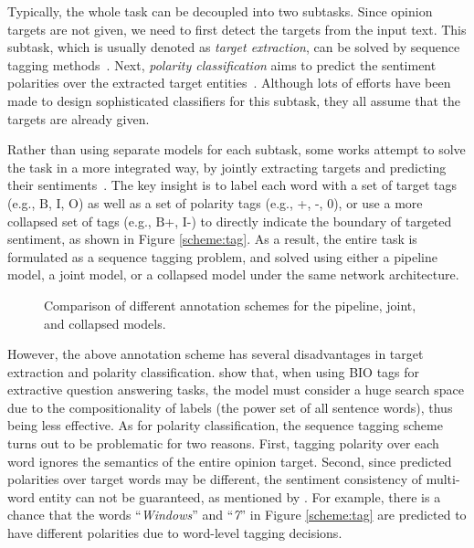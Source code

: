 \documentclass[11pt,a4paper]{article}
\begin{document}
Typically, the whole task can be decoupled into two subtasks.
Since opinion targets are not given, we need to first detect the targets from the input text.
This subtask, which is usually denoted as \emph{target extraction}, can be solved by sequence tagging methods~\cite{jakob2010extracting,liu2015fine,wang2016recursive,poria2016aspect,shu2017lifelong,he2017unsupervised,xu2018double}.
Next, \emph{polarity classification} aims to predict the sentiment polarities over the extracted target entities~\cite{jiang2011target,dong2014adaptive,tang2015effective,wang2016attention,chen2017recurrent,xue2018aspect,li2018transformation,fan2018multi}. 
Although lots of efforts have been made to design sophisticated classifiers for this subtask, they all assume that the targets are already given.

Rather than using separate models for each subtask, some works attempt to solve the task in a more integrated way, by jointly extracting targets and predicting their sentiments~\cite{mitchell2013open,zhang2015neural,li2018unified}.
The key insight is to label each word with a set of target tags (e.g., $\mathrm{B}$, $\mathrm{I}$, $\mathrm{O}$) as well as a set of polarity tags (e.g., +, -, 0), or use a more collapsed set of tags (e.g., $\mathrm{B}$+, $\mathrm{I}$-) to directly indicate the boundary of targeted sentiment, as shown in Figure \ref{scheme:tag}. 
As a result, the entire task is formulated as a sequence tagging problem, and solved using either a pipeline model, a joint model, or a collapsed model under the same network architecture.

\begin{figure*}
  \centering
  \hspace{0.3in}  
  \caption{Comparison of different annotation schemes for the pipeline, joint, and collapsed models.}
  \label{fig:scheme} \end{figure*}

However, the above annotation scheme has several disadvantages in target extraction and polarity classification.
\citet{lee2016learning} show that, when using BIO tags for extractive question answering tasks, the model must consider a huge search space due to the compositionality of labels (the power set of all sentence words), thus being less effective.
As for polarity classification, the sequence tagging scheme turns out to be problematic for two reasons. 
First, tagging polarity over each word ignores the semantics of the entire opinion target.
Second, since predicted polarities over target words may be different, the sentiment consistency of multi-word entity can not be guaranteed, as mentioned by \citet{li2018unified}.
For example, there is a chance that the words ``\emph{Windows}'' and ``\emph{7}'' in Figure \ref{scheme:tag} are predicted to have different polarities due to word-level tagging decisions.
\end{document}
